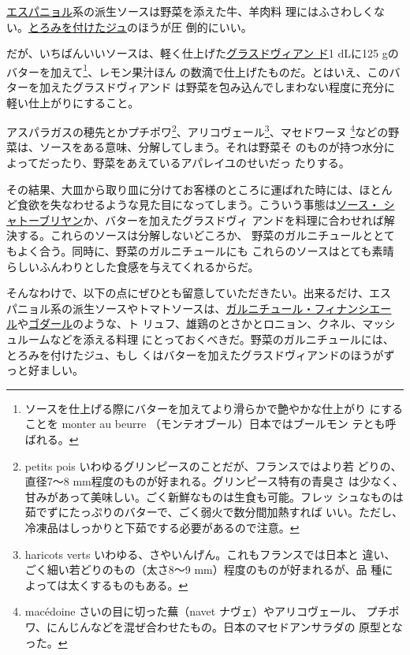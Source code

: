\vspace{1\zw}

\protect\hyperlink{sauce-espagnole}{エスパニョル}系の派生ソースは野菜を添えた牛、羊肉料
理にはふさわしくない。\protect\hyperlink{jus-de-veau-lie}{とろみを付けたジュ}のほうが圧
倒的にいい。

だが、いちばんいいソースは、軽く仕上げた\protect\hyperlink{glace-de-viande}{グラスドヴィアン
ド}1 dLに125 gのバターを加えて\footnote{ソースを仕上げる際にバターを加えてより滑らかで艶やかな仕上がり
  にすることを monter au beurre （モンテオブール）日本ではブールモン
  テとも呼ばれる。}、レモン果汁ほん
の数滴で仕上げたものだ。とはいえ、このバターを加えたグラスドヴィアンド
は野菜を包み込んでしまわない程度に充分に軽い仕上がりにすること。

アスパラガスの穂先とかプチポワ\footnote{petits pois
  いわゆるグリンピースのことだが、フランスではより若 どりの、直径7〜8
  mm程度のものが好まれる。グリンピース特有の青臭さ
  は少なく、甘みがあって美味しい。ごく新鮮なものは生食も可能。フレッ
  シュなものは茹でずにたっぷりのバターで、ごく弱火で数分間加熱すれば
  いい。ただし、冷凍品はしっかりと下茹でする必要があるので注意。}、アリコヴェール\footnote{haricots
  verts いわゆる、さやいんげん。これもフランスでは日本と
  違い、ごく細い若どりのもの（太さ8〜9 mm）程度のものが好まれるが、品
  種によっては太くするものもある。}、マセドワーヌ \footnote{macédoine
  さいの目に切った蕪（navet ナヴェ）やアリコヴェール、
  プチポワ、にんじんなどを混ぜ合わせたもの。日本のマセドアンサラダの
  原型となった。}などの野菜は、ソースをある意味、分解してしまう。それは野菜そ
のものが持つ水分によってだったり、野菜をあえているアパレイユのせいだっ
たりする。

その結果、大皿から取り皿に分けてお客様のところに運ばれた時には、ほとん
ど食欲を失なわせるような見た目になってしまう。こういう事態は\protect\hyperlink{sauce-chateaubriand}{ソース・
シャトーブリヤン}か、バターを加えたグラスドヴィ
アンドを料理に合わせれば解決する。これらのソースは分解しないどころか、
野菜のガルニチュールととてもよく合う。同時に、野菜のガルニチュールにも
これらのソースはとても素晴らしいふんわりとした食感を与えてくれるからだ。

そんなわけで、以下の点にぜひとも留意していただきたい。出来るだけ、エス
パニョル系の派生ソースやトマトソースは、\protect\hyperlink{garniture-financiere}{ガルニチュール・フィナンシエー
ル}や\protect\hyperlink{garniture-godard}{ゴダール}のような、ト
リュフ、雄鶏のとさかとロニョン、クネル、マッシュルームなどを添える料理
にとっておくべきだ。野菜のガルニチュールには、とろみを付けたジュ、もし
くはバターを加えたグラスドヴィアンドのほうがずっと好ましい。

